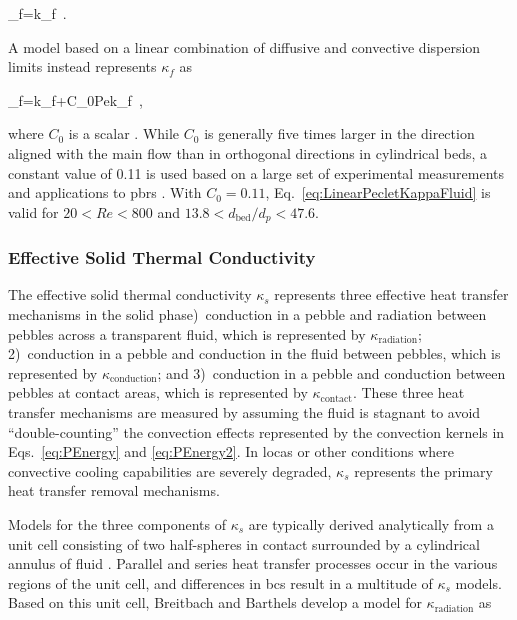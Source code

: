 \beq
\label{eq:KappaFluidBasic}
\kappa_f=\epsilon k_f\ .
\eeq

\noindent A model based on a linear combination of diffusive and convective dispersion limits instead represents \(\kappa_f\) as

\beq
\label{eq:LinearPecletKappaFluid}
\kappa_f=\epsilon k_f+C_0Pek_f\ ,
\eeq

\noindent where \(C_0\) is a scalar \cite{yagi1957, schertz, tsotsas, yagi,amiri,amiri1995,delgado}. While \(C_0\) is generally five times larger in the direction aligned with the main flow than in orthogonal directions in cylindrical beds, a constant value of 0.11 is used based on a large set of experimental measurements and applications to \glspl{pbr} \cite{yagi1957,auwerda_2011,delgado,amiri1995,yagi,tsotsas}. With \(C_0=0.11\), Eq.\ \eqref{eq:LinearPecletKappaFluid} is valid for \(20<Re<800\) and \(13.8<d_\text{bed}/d_p<47.6\).

\subsubsection{Effective Solid Thermal Conductivity}
\label{sec:KappaS}

The effective solid thermal conductivity \(\kappa_s\) represents three effective heat transfer mechanisms in the solid phase)~conduction in a pebble and radiation between pebbles across a transparent fluid, which is represented by \(\kappa_\text{radiation}\); 2)~conduction in a pebble and conduction in the fluid between pebbles, which is represented by \(\kappa_\textrm{conduction}\); and 3)~conduction in a pebble and conduction between pebbles at contact areas, which is represented by \(\kappa_\textrm{contact}\). These three heat transfer mechanisms are measured by assuming the fluid is stagnant to avoid ``double-counting'' the convection effects represented by the convection kernels in Eqs.\ \eqref{eq:PEnergy} and \eqref{eq:PEnergy2}. In \glspl{loca} or other conditions where convective cooling capabilities are severely degraded, \(\kappa_s\) represents the primary heat transfer removal mechanisms. 

Models for the three components of \(\kappa_s\) are typically derived analytically from a unit cell consisting of two half-spheres in contact surrounded by a cylindrical annulus of fluid \cite{breitbach}. Parallel and series heat transfer processes occur in the various regions of the unit cell, and differences in \glspl{bc} result in a multitude of \(\kappa_s\) models. Based on this unit cell, Breitbach and Barthels develop a model for \(\kappa_\text{radiation}\) as

